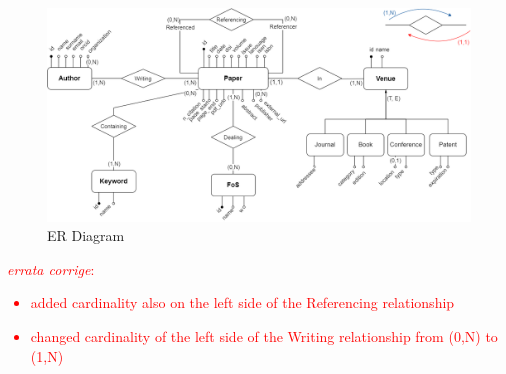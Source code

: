 \documentclass{Configuration_Files/PoliMi3i_thesis}
\begin{document}
\begin{figure}[H]
    \centering
    \includegraphics[width=1\textwidth]{Images/er_diagram.png}
    \caption{ER Diagram}
    \label{fig:quadtree}
\end{figure}
\textcolor{red}{\textit{errata corrige}: 
    \begin{itemize}
        \item added cardinality also on the left side of the Referencing relationship
        \item changed cardinality of the left side of the Writing relationship from (0,N) to (1,N)
    \end{itemize}
}
\end{document}
